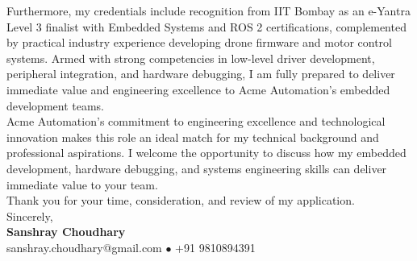 \documentclass[10pt,a4paper]{article}%
\begin{document}
\noindent Furthermore, my credentials include recognition from IIT Bombay as an e-Yantra Level 3 finalist with Embedded Systems and ROS 2 certifications, complemented by practical industry experience developing drone firmware and motor control systems. Armed with strong competencies in low-level driver development, peripheral integration, and hardware debugging, I am fully prepared to deliver immediate value and engineering excellence to Acme Automation's embedded development teams. \vspace{8pt}\\

\noindent Acme Automation's commitment to engineering excellence and technological innovation makes this role an ideal match for my technical background and professional aspirations. I welcome the opportunity to discuss how my embedded development, hardware debugging, and systems engineering skills can deliver immediate value to your team. \vspace{8pt}\\%

\noindent Thank you for your time, consideration, and review of my application. \vspace{18pt}\\%

\noindent Sincerely, \vspace{8pt}\\%
\textbf{Sanshray Choudhary} \\%
sanshray.choudhary@gmail.com $\bullet$ +91 9810894391 \\%
\end{document}
